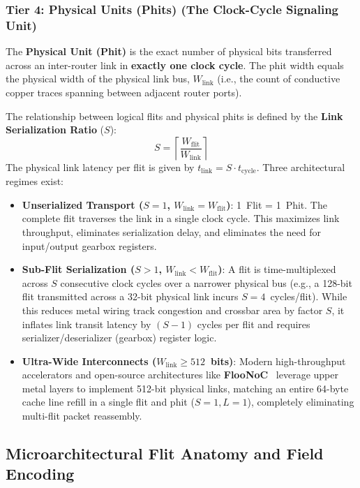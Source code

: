 \subsubsection{Tier 4: Physical Units (Phits) (The Clock-Cycle Signaling Unit)}
The \textbf{Physical Unit (Phit)} is the exact number of physical bits transferred across an inter-router link in \textbf{exactly one clock cycle}. The phit width equals the physical width of the physical link bus, $W_{\text{link}}$ (i.e., the count of conductive copper traces spanning between adjacent router ports).

The relationship between logical flits and physical phits is defined by the \textbf{Link Serialization Ratio} ($S$):
\begin{equation}
S = \left\lceil \frac{W_{\text{flit}}}{W_{\text{link}}} \right\rceil
\label{eq:ch2_serialization_ratio}
\end{equation}
The physical link latency per flit is given by $t_{\text{link}} = S \cdot t_{\text{cycle}}$. Three architectural regimes exist:
\begin{itemize}
    \item \textbf{Unserialized Transport ($S = 1$, $W_{\text{link}} = W_{\text{flit}}$)}: 1~Flit = 1~Phit. The complete flit traverses the link in a single clock cycle. This maximizes link throughput, eliminates serialization delay, and eliminates the need for input/output gearbox registers.
    \item \textbf{Sub-Flit Serialization ($S > 1$, $W_{\text{link}} < W_{\text{flit}}$)}: A flit is time-multiplexed across $S$ consecutive clock cycles over a narrower physical bus (e.g., a 128-bit flit transmitted across a 32-bit physical link incurs $S = 4$~cycles/flit). While this reduces metal wiring track congestion and crossbar area by factor $S$, it inflates link transit latency by $(S - 1)$ cycles per flit and requires serializer/deserializer (gearbox) register logic.
    \item \textbf{Ultra-Wide Interconnects ($W_{\text{link}} \ge 512$~bits)}: Modern high-throughput accelerators and open-source architectures like \textbf{FlooNoC}~\cite{Fischer2025} leverage upper metal layers to implement 512-bit physical links, matching an entire 64-byte cache line refill in a single flit and phit ($S = 1, L = 1$), completely eliminating multi-flit packet reassembly.
\end{itemize}

\subsection{Microarchitectural Flit Anatomy and Field Encoding}
\label{subsec:ch2_flit_anatomy}

